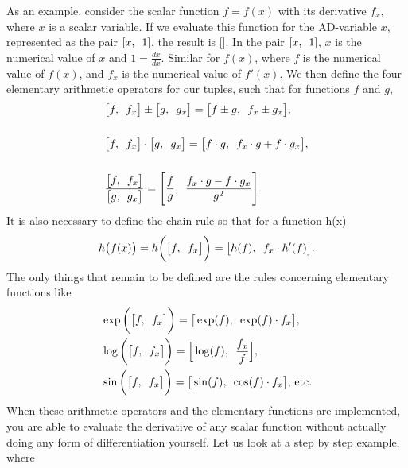As an example, consider the scalar function $f = f(x)$ with its derivative $f_x$, where $x$ is a scalar variable. If we evaluate this function for the AD-variable $x$, represented as the pair $[x,\hspace{0.5em}1]$, the result is []. In the pair $[x,\hspace{0.5em}1]$, $x$ is the numerical value of $x$ and $1 = \frac{dx}{dx}$. Similar for $f(x)$, where $f$ is the numerical value of $f(x)$, and $f_x$ is the numerical value of $f'(x)$.  We then define the four elementary arithmetic operators for our tuples, such that for functions $f$ and $g$,
\begin{equation}
    \begin{aligned}
    &\big[f,\hspace{0.5em}f_x\big] \pm \big[g,\hspace{0.5em}g_x   \big] = \big[f \pm g,\hspace{0.5em}f_x \pm g_x \big] ,\\\\
    &\big[  f,\hspace{0.5em}f_x   \big]\cdot \big[  g,\hspace{0.5em}g_x   \big] = \big[  f\cdot g,\hspace{0.5em}f_x\cdot g + f\cdot g_x   \big],\\\\
    &\frac{\big[ f,\hspace{0.5em}f_x   \big]}{\big[  g,\hspace{0.5em}g_x   \big]} = \Bigg[  \frac{f}{g},\hspace{0.5em}\frac{f_x\cdot g - f\cdot g_x}{g^2}\Bigg].
\end{aligned}
\label{eq:arithmeticOperators}
\end{equation}
It is also necessary to define the chain rule so that for a function h(x)
\begin{equation*}
h\big(f(x)\big) = h\bigg(\big[ f ,\hspace{0.5em}f_x  \big]\bigg) = \big[ h(f),\hspace{0.5em} f_x\cdot h'(f) \big].
\end{equation*}
The only things that remain to be defined are the rules concerning elementary functions like
\begin{equation}
    \begin{aligned}
        &\exp\bigg(\big[ f,\hspace{0.5em}f_x  \big]\bigg) =  \big[ \exp(f),\hspace{0.5em}\exp(f)\cdot f_x  \big],\\
        &\log\bigg(\big[ f,\hspace{0.5em}f_x  \big]\bigg) =  \Big[  \log(f),\hspace{0.5em}\frac{f_x}{f}   \Big],\\
        &\sin\bigg(\big[  f,\hspace{0.5em}f_x   \big]\bigg) =  \big[  \sin(f),\hspace{0.5em}\cos(f)\cdot f_x   \big]\text{,  etc.}
    \end{aligned}
\label{eq:elementaryFunctions}
\end{equation}
When these arithmetic operators and the elementary functions are implemented, you are able to evaluate the derivative of any scalar function without actually doing any form of differentiation yourself. Let us look at a step by step example, where 

